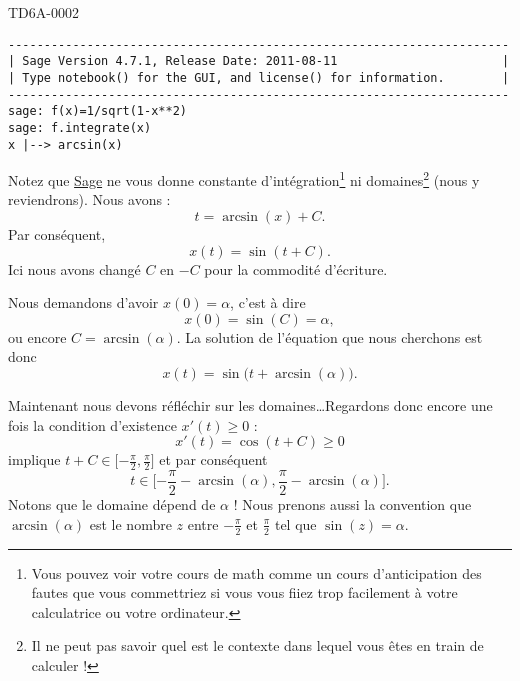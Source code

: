 \begin{corrige}{TD6A-0002}
\begin{enumerate}
            \begin{verbatim}
----------------------------------------------------------------------
| Sage Version 4.7.1, Release Date: 2011-08-11                       |
| Type notebook() for the GUI, and license() for information.        |
----------------------------------------------------------------------
sage: f(x)=1/sqrt(1-x**2)
sage: f.integrate(x)
x |--> arcsin(x)
            \end{verbatim}
            Notez que \href{http://sagemath.org}{Sage} ne vous donne constante d'intégration\footnote{Vous pouvez voir votre cours de math comme un cours d'anticipation des fautes que vous commettriez si vous vous fiiez trop facilement à votre calculatrice ou votre ordinateur.} ni domaines\footnote{Il ne peut pas savoir quel est le contexte dans lequel vous êtes en train de calculer !} (nous y reviendrons). Nous avons :
            \begin{equation}
                t=\arcsin(x)+C.
            \end{equation}
            Par conséquent,
            \begin{equation}
                x(t)=\sin(t+C).
            \end{equation}
            Ici nous avons changé \( C\) en \( -C\) pour la commodité d'écriture.

            Nous demandons d'avoir \( x(0)=\alpha\), c'est à dire
            \begin{equation}
                x(0)=\sin(C)=\alpha,
            \end{equation}
            ou encore \( C=\arcsin(\alpha)\). La solution de l'équation que nous cherchons est donc
            \begin{equation}
                x(t)=\sin\big(t+\arcsin(\alpha)\big).
            \end{equation}
            
            Maintenant nous devons réfléchir sur les domaines\ldots Regardons donc encore une fois la condition d'existence \( x'(t)\geq 0\) :
            \begin{equation}
                x'(t)=\cos(t+C)\geq 0
            \end{equation}
            implique \( t+C\in\mathopen[ -\frac{ \pi }{2} , \frac{ \pi }{2} \mathclose]\) et par conséquent
            \begin{equation}
                t\in\mathopen[ -\frac{ \pi }{2}-\arcsin(\alpha) , \frac{ \pi }{ 2 }-\arcsin(\alpha) \mathclose].
            \end{equation}
            Notons que le domaine dépend de \( \alpha\) ! Nous prenons aussi la convention que \( \arcsin(\alpha)\) est le nombre \( z\) entre \( -\frac{ \pi }{2}\) et \( \frac{ \pi }{2}\) tel que \( \sin(z)=\alpha\).
            


\end{enumerate}
\end{corrige}
